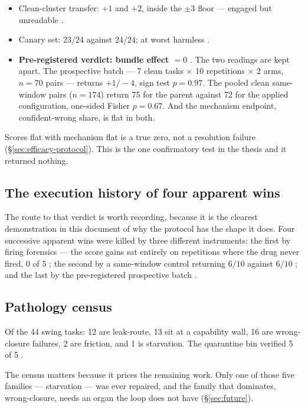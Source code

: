 \begin{itemize}
  \item Clean-cluster transfer: $+1$ and $+2$, inside the $\pm3$ floor ---
        engaged but unreadable .
  \item Canary set: $23/24$ against $24/24$; at worst harmless .
  \item \textbf{Pre-registered verdict: bundle effect $= 0$} . The
        two readings are kept apart. The prospective batch --- 7 clean
        tasks $\times$ 10 repetitions $\times$ 2 arms, $n{=}70$ pairs ---
        returns $+1/-4$, sign test $p = 0.97$. The pooled clean
        same-window pairs ($n{=}174$) return 75 for the parent against 72
        for the applied configuration, one-sided Fisher $p = 0.67$. And
        the mechanism endpoint, confident-wrong share, is flat in both.
\end{itemize}

Scores flat with mechanism flat is a true zero, not a resolution failure
(\S\ref{sec:efficacy-protocol}). This is the one confirmatory test in the
thesis and it returned nothing.

\subsection*{The execution history of four apparent wins}

The route to that verdict is worth recording, because it is the clearest
demonstration in this document of why the protocol has the shape it does.
Four successive apparent wins were killed by three different instruments:
the first by firing forensics --- the score gains sat entirely on
repetitions where the drug never fired, 0 of 5 ; the second by a
same-window control returning $6/10$ against $6/10$ ; and the last by
the pre-registered prospective batch .

\subsection*{Pathology census}

Of the 44 swing tasks: 12 are leak-route, 13 sit at a capability wall, 16
are wrong-closure failures, 2 are friction, and 1 is starvation. The
quarantine bin verified 5 of 5 .

The census matters because it prices the remaining work. Only one of those
five families --- starvation --- was ever repaired, and the family that
dominates, wrong-closure, needs an organ the loop does not have
(\S\ref{sec:future}).

